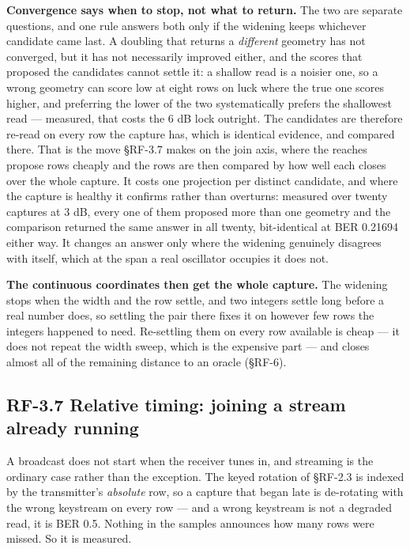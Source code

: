 \documentclass[10pt,letterpaper,twocolumn]{article}
\begin{document}
\textbf{Convergence says when to stop, not what to return.} The two are separate questions, and one rule answers both only if the widening keeps whichever candidate came last. A doubling that returns a \emph{different} geometry has not converged, but it has not necessarily improved either, and the scores that proposed the candidates cannot settle it: a shallow read is a noisier one, so a wrong geometry can score low at eight rows on luck where the true one scores higher, and preferring the lower of the two systematically prefers the shallowest read --- measured, that costs the 6 dB lock outright. The candidates are therefore re-read on every row the capture has, which is identical evidence, and compared there. That is the move §RF-3.7 makes on the join axis, where the reaches propose rows cheaply and the rows are then compared by how well each closes over the whole capture. It costs one projection per distinct candidate, and where the capture is healthy it confirms rather than overturns: measured over twenty captures at 3 dB, every one of them proposed more than one geometry and the comparison returned the same answer in all twenty, bit-identical at BER 0.21694 either way. It changes an answer only where the widening genuinely disagrees with itself, which at the span a real oscillator occupies it does not.

\textbf{The continuous coordinates then get the whole capture.} The widening stops when the width and the row settle, and two integers settle long before a real number does, so settling the pair there fixes it on however few rows the integers happened to need. Re-settling them on every row available is cheap --- it does not repeat the width sweep, which is the expensive part --- and closes almost all of the remaining distance to an oracle (§RF-6).

\subsection{RF-3.7 Relative timing: joining a stream already running}\label{rf-37-relative-timing-joining-a-stream-already-running}

A broadcast does not start when the receiver tunes in, and streaming is the ordinary case rather than the exception. The keyed rotation of §RF-2.3 is indexed by the transmitter's \emph{absolute} row, so a capture that began late is de-rotating with the wrong keystream on every row --- and a wrong keystream is not a degraded read, it is BER 0.5. Nothing in the samples announces how many rows were missed. So it is measured.
\end{document}
